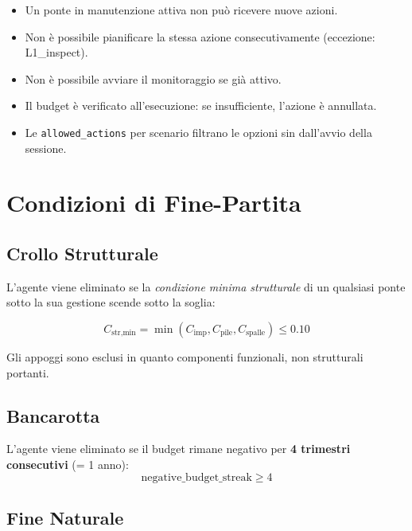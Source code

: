\documentclass[11pt,a4paper]{article}
\begin{document}
\begin{itemize}
  \item Un ponte in manutenzione attiva non pu\`o ricevere nuove azioni.
  \item Non \`e possibile pianificare la stessa azione consecutivamente (eccezione: L1\_inspect).
  \item Non \`e possibile avviare il monitoraggio se gi\`a attivo.
  \item Il budget \`e verificato all'esecuzione: se insufficiente, l'azione \`e annullata.
  \item Le \texttt{allowed\_actions} per scenario filtrano le opzioni sin dall'avvio della sessione.
\end{itemize}

\section{Condizioni di Fine-Partita}

\subsection{Crollo Strutturale}

L'agente viene eliminato se la \textit{condizione minima strutturale} di un qualsiasi ponte sotto la sua gestione scende sotto la soglia:

\begin{equation}
  C_{\text{str,min}} = \min(C_{\text{imp}}, C_{\text{pile}}, C_{\text{spalle}}) \leq 0.10
\end{equation}

Gli appoggi sono esclusi in quanto componenti funzionali, non strutturali portanti.

\subsection{Bancarotta}

L'agente viene eliminato se il budget rimane negativo per \textbf{4 trimestri consecutivi} (= 1 anno):
\begin{equation}
  \text{negative\_budget\_streak} \geq 4
\end{equation}

\subsection{Fine Naturale}
\end{document}
